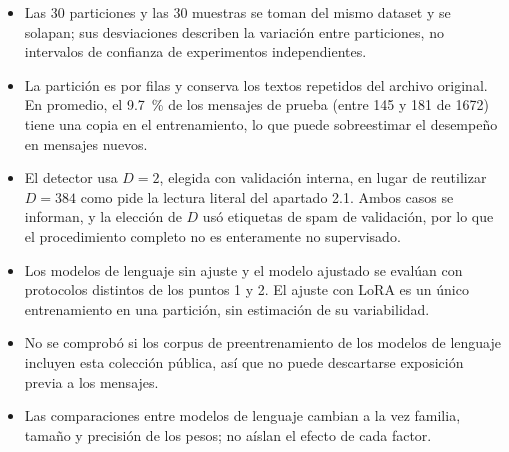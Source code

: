 \begin{itemize}
    \item Las 30 particiones y las 30 muestras se toman del mismo dataset y
    se solapan; sus desviaciones describen la variación entre particiones,
    no intervalos de confianza de experimentos independientes.
    \item La partición es por filas y conserva los textos repetidos del
    archivo original. En promedio, el 9.7~\% de los mensajes de prueba
    (entre 145 y 181 de 1672) tiene una copia en el entrenamiento, lo que
    puede sobreestimar el desempeño en mensajes nuevos.
    \item El detector usa $D=2$, elegida con validación interna, en lugar
    de reutilizar $D=384$ como pide la lectura literal del apartado 2.1.
    Ambos casos se informan, y la elección de $D$ usó etiquetas de spam de
    validación, por lo que el procedimiento completo no es enteramente no
    supervisado.
    \item Los modelos de lenguaje sin ajuste y el modelo ajustado se evalúan
    con protocolos distintos de los puntos 1 y 2. El ajuste con LoRA es un
    único entrenamiento en una partición, sin estimación de su variabilidad.
    \item No se comprobó si los corpus de preentrenamiento de los modelos de
    lenguaje incluyen esta colección pública, así que no puede descartarse
    exposición previa a los mensajes.
    \item Las comparaciones entre modelos de lenguaje cambian a la vez
    familia, tamaño y precisión de los pesos; no aíslan el efecto de cada
    factor.
\end{itemize}
